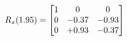 \documentclass[preview]{standalone}
\begin{document}
\begin{align*}
\special{dvisvgm:raw <g id='unique000'>}R_{x}(1.95) = \begin{bmatrix}1 & 0 & 0 \\0 & -0.37 & -0.93 \\0 & +0.93 & -0.37\end{bmatrix}\special{dvisvgm:raw </g>}
\end{align*}
\end{document}
